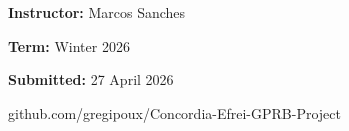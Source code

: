 {\begin{titlepage}
  \vspace{0.7cm}

  {\large \textbf{Instructor:} Marcos Sanches \par}
  \vspace{0.1cm}
  {\large \textbf{Term:} Winter 2026 \par}
  \vspace{0.1cm}
  {\large \textbf{Submitted:} 27 April 2026 \par}

  \vspace{0.4cm}
  {\small\ttfamily github.com/gregipoux/Concordia-Efrei-GPRB-Project \par}

  \vfill
  \end{titlepage}
}

\let\origsection\section
\renewcommand{\section}{\clearpage\origsection}

\setlength{\intextsep}{12pt plus 2pt minus 2pt}

\renewcommand{\figurename}{\textbf{Figure}}
